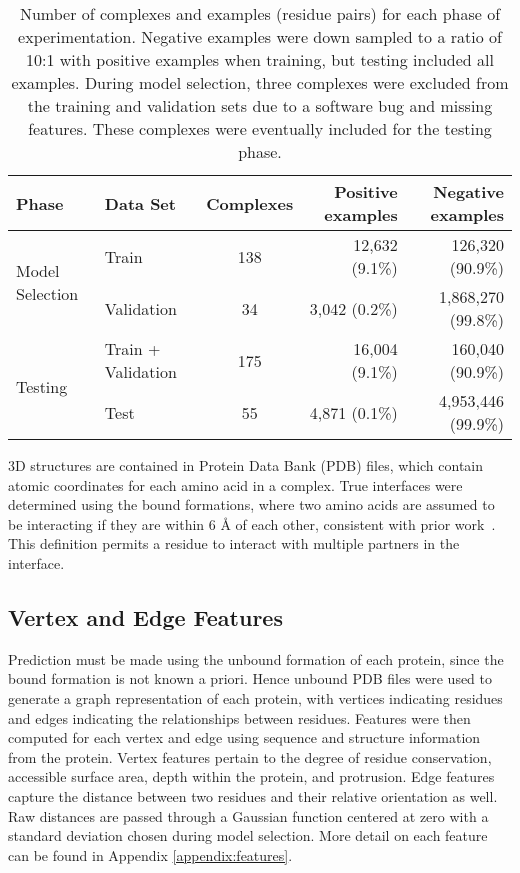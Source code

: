 \begin{table}
	\centering
	\begin{tabular}{l l c r r}
		\toprule
		Phase & Data Set & Complexes & Positive examples  & Negative examples \\ 
		\midrule
		\multirow{2}{*}{Model Selection} 
			& Train      & 138       & 12,632 (9.1\%)     & 126,320 (90.9\%) \\
			& Validation & 34        & 3,042 (0.2\%) 		& 1,868,270 (99.8\%) \\
		\midrule
		\multirow{2}{*}{Testing}
			& Train + Validation & 175 & 16,004 (9.1\%) & 160,040 (90.9\%) \\
			& Test       & 55        & 4,871 (0.1\%)      & 4,953,446 (99.9\%) \\ 
		\bottomrule
	\end{tabular}
	\caption{Number of complexes and examples (residue pairs) for each phase of experimentation. Negative examples were down sampled to a ratio of 10:1 with positive examples when training, but testing included all examples. During model selection, three complexes were excluded from the training and validation sets due to a software bug and missing features. These complexes were eventually included for the testing phase. \label{tab:dataset_size}}
	\label{tab:examples}
\end{table}

3D structures are contained in Protein Data Bank (PDB) files, which contain atomic coordinates for each amino acid in a complex.
True interfaces were determined using the bound formations, where two amino acids are assumed to be interacting if they are within 6 \AA{} of each other, consistent with prior work~\cite{ofran2007, ahmad2011, minhas2014}.
This definition permits a residue to interact with multiple partners in the interface.

\subsection{Vertex and Edge Features}
Prediction must be made using the unbound formation of each protein, since the bound formation is not known a priori.
Hence unbound PDB files were used to generate a graph representation of each protein, with vertices indicating residues and edges indicating the relationships between residues.
Features were then computed for each vertex and edge using sequence and structure information from the protein.
Vertex features pertain to the degree of residue conservation, accessible surface area, depth within the protein, and protrusion.
Edge features capture the distance between two residues and their relative orientation as well.
Raw distances are passed through a Gaussian function centered at zero with a standard deviation chosen during model selection.
More detail on each feature can be found in Appendix \ref{appendix:features}.

